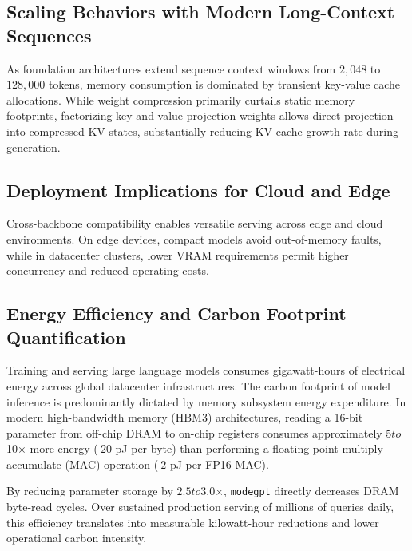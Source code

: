 \subsection{Scaling Behaviors with Modern Long-Context Sequences}
As foundation architectures extend sequence context windows from $2{,}048$ to $128{,}000$ tokens, memory consumption is dominated by transient key-value cache allocations. While weight compression primarily curtails static memory footprints, factorizing key and value projection weights allows direct projection into compressed KV states, substantially reducing KV-cache growth rate during generation.

\subsection{Deployment Implications for Cloud and Edge}
Cross-backbone compatibility enables versatile serving across edge and cloud environments. On edge devices, compact models avoid out-of-memory faults, while in datacenter clusters, lower VRAM requirements permit higher concurrency and reduced operating costs.

\subsection{Energy Efficiency and Carbon Footprint Quantification}
Training and serving large language models consumes gigawatt-hours of electrical energy across global datacenter infrastructures. The carbon footprint of model inference is predominantly dictated by memory subsystem energy expenditure. In modern high-bandwidth memory (HBM3) architectures, reading a 16-bit parameter from off-chip DRAM to on-chip registers consumes approximately $5$\times$ to $10$\times$ more energy ($~20$ pJ per byte) than performing a floating-point multiply-accumulate (MAC) operation ($~2$ pJ per FP16 MAC).

By reducing parameter storage by $2.5$\times$ to $3.0$\times$, \texttt{modegpt} directly decreases DRAM byte-read cycles. Over sustained production serving of millions of queries daily, this efficiency translates into measurable kilowatt-hour reductions and lower operational carbon intensity.
